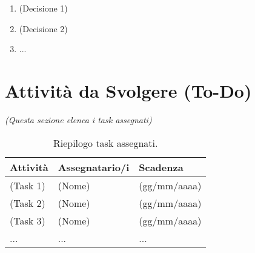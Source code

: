 \documentclass[a4paper, 11pt, oneside]{scrartcl} %
\begin{document}
\begin{enumerate}
    \item (Decisione 1)
    \item (Decisione 2)
    \item ...
\end{enumerate}

\newpage
\section{Attività da Svolgere (To-Do)}
\emph{(Questa sezione elenca i task assegnati)}

\begin{table}[h!]
\centering
\begin{tabular}{@{}lll@{}}
\toprule
\textbf{Attività} & \textbf{Assegnatario/i} & \textbf{Scadenza} \\
\midrule
(Task 1) & (Nome) & (gg/mm/aaaa) \\
(Task 2) & (Nome) & (gg/mm/aaaa) \\
(Task 3) & (Nome) & (gg/mm/aaaa) \\
... & ... & ... \\
\bottomrule
\end{tabular}
\caption{Riepilogo task assegnati.}
\end{table}
\end{document}
